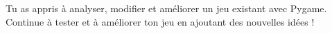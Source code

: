 Tu as appris à analyser, modifier et améliorer un jeu existant avec Pygame.  Continue à tester et à améliorer ton jeu en ajoutant des nouvelles idées !




